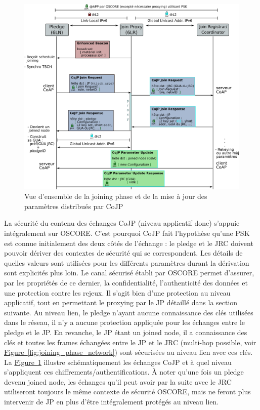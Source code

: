 \documentclass[]{report}
\newcommand{\wordlink}[2]{\hyperref[#2]{#1~\ref{#2}}}
\begin{document}
	\begin{figure}[!ht]
	\centering
	\includegraphics[width=\linewidth]{joining_phase_simplified}
	\caption{Vue d'ensemble de la joining phase et de la mise à jour des paramètres distribués par CoJP}
	\label{fig:joining_phase_simplified}
	\end{figure}

\vspace{0.3cm}

La sécurité du contenu des échanges CoJP (niveau applicatif donc) s'appuie intégralement sur OSCORE. C'est pourquoi CoJP fait l'hypothèse qu'une PSK est connue initialement des deux côtés de l'échange : le pledge et le JRC doivent pouvoir dériver des contextes de sécurité qui se correspondent. Les détails de quelles valeurs sont utilisées pour les différents paramètres durant la dérivation sont explicités plus loin. Le canal sécurisé établi par OSCORE permet d'assurer, par les propriétés de ce dernier, la confidentialité, l'authenticité des données et une protection contre les rejeux. Il s'agit bien d'une protection au niveau applicatif, tout en permettant le proxying par le JP détaillé dans la section suivante. Au niveau lien, le pledge n'ayant aucune connaissance des clés utilisées dans le réseau, il n'y a aucune protection appliquée pour les échanges entre le pledge et le JP. En revanche, le JP étant un joined node, il a connaissance des clés et toutes les frames échangées entre le JP et le JRC (multi-hop possible, voir \wordlink{Figure}{fig:joining_phase_network}) sont sécurisées au niveau lien avec ces clés. La \wordlink{Figure}{fig:joining_phase_simplified} illustre schématiquement les échanges CoJP et à quel niveau s'appliquent ces chiffrements/authentifications. À noter qu'une fois un pledge devenu joined node, les échanges qu'il peut avoir par la suite avec le JRC utiliseront toujours le même contexte de sécurité OSCORE, mais ne feront plus intervenir de JP en plus d'être intégralement protégés au niveau lien.
\end{document}
